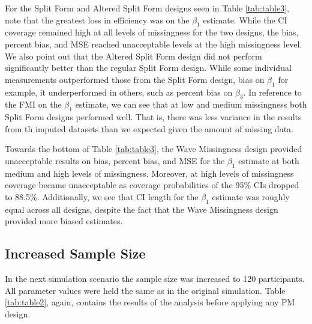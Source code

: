 \documentclass{svjour3}                     %
\begin{document}
For the Split Form and Altered Split Form designs seen in Table \ref{tab:table3}, note that the greatest loss in efficiency was on the $\beta_1$ estimate. While the CI coverage remained high at all levels of missingness for the two designs, the bias, percent bias, and MSE reached unacceptable levels at the high missingness level. We also point out that the Altered Split Form design did not perform significantly better than the regular Split Form design. While some individual measurements outperformed those from the Split Form design, bias on $\beta_1$ for example, it underperformed in others, such as percent bias on $\beta_3$. In reference to the FMI on the $\beta_1$ estimate, we can see that at low and medium missingness both Split Form designs performed well. That is, there was less variance in the results from th imputed datasets than we expected given the amount of missing data.\par

Towards the bottom of Table \ref{tab:table3}, the Wave Missingness design provided unacceptable results on bias, percent bias, and MSE for the $\beta_1$ estimate at both medium and high levels of missingness. Moreover, at high levels of missingness coverage became unacceptable as coverage probabilities of the 95\% CIs dropped to 88.5\%.  Additionally, we see that CI length for the $\beta_1$ estimate was roughly equal across all designs, despite the fact that the Wave Missingness design provided more biased estimates. \par

\subsection{Increased Sample Size}
\label{sec:3.2}
In the next simulation scenario the sample size was increased to 120 participants. All parameter values were held the same as in the original simulation. Table \ref{tab:table2}, again, contains the results of the analysis before applying any PM design. \par
\end{document}
